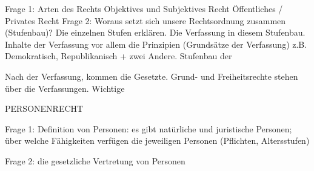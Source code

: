 \documentclass[a4paper]{report}
\begin{document}
Frage 1: Arten des Rechts
Objektives und Subjektives Recht
Öffentliches / Privates Recht
\newline
\newline
Frage 2: Woraus setzt sich unsere Rechtsordnung zusammen (Stufenbau)? Die einzelnen Stufen erklären. Die Verfassung in diesem Stufenbau. Inhalte der Verfassung vor allem die Prinzipien (Grundsätze der Verfassung) z.B. Demokratisch, Republikanisch + zwei Andere.
\newline
\newline
Stufenbau der 

Nach der Verfassung, kommen die Gesetzte. Grund- und Freiheitsrechte stehen über die Verfassungen. Wichtige

PERSONENRECHT

Frage 1: Definition von Personen: es gibt natürliche und juristische Personen; über welche Fähigkeiten verfügen die jeweiligen Personen (Pflichten, Altersstufen)

Frage 2: die gesetzliche Vertretung von Personen
\end{document}
